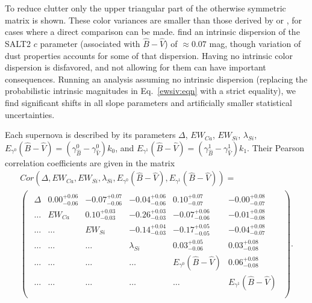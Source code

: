 \documentclass{aastex61}   	%
\begin{document}
To reduce clutter only the upper triangular part of the otherwise symmetric matrix is shown.
These color variances are smaller than those derived by \citet{2003A&A...404..901N} or \citet{2007ApJ...659..122J}, for cases where
a direct comparison can be made.
  find an intrinsic dispersion of the SALT2 $c$ parameter (associated with ${\hat{B}}-{\hat{V}}$) of $\approx 0.07$ mag,
though variation of dust properties accounts for some of that dispersion.
Having no intrinsic color dispersion is disfavored, and not allowing for them can have important consequences.  Running an analysis assuming no intrinsic dispersion (replacing the probabilistic intrinsic magnitudes in Eq.~\ref{ewsiv:eqn}
with a strict equality), we find significant shifts in all slope parameters  and 
artificially
smaller statistical uncertainties.

Each supernova is described by its parameters $\Delta$, $EW_{Ca}$, $EW_{Si}$, $\lambda_{Si}$,
$E_{\gamma^0}({\hat{B}}-{\hat{V}})=(\gamma^0_{\hat{B}}-\gamma^0_{\hat{V}})k_0$, and $E_{\gamma^1}({\hat{B}}-{\hat{V}})=(\gamma^1_{\hat{B}}-\gamma^1_{\hat{V}})k_1$.
Their Pearson correlation coefficients  are given in the matrix
\begin{multline}
Cor(\Delta, EW_{Ca}, EW_{Si}, \lambda_{Si}, E_{\gamma^0}({\hat{B}}-{\hat{V}}), E_{\gamma^1}({\hat{B}}-{\hat{V}})) =\\
\begin{pmatrix}
\begin{array}{rrrrrr}
\Delta & 0.00^{+0.06}_{-0.06} & -0.07^{+0.07}_{-0.06} & -0.04^{+0.06}_{-0.06} & 0.10^{+0.07}_{-0.07} & -0.00^{+0.08}_{-0.07} \\
\ldots  &EW_{Ca} & 0.10^{+0.03}_{-0.03} & -0.26^{+0.03}_{-0.03} & -0.07^{+0.06}_{-0.06} & -0.01^{+0.08}_{-0.08} \\
\ldots  & \ldots &  EW_{Si} & -0.14^{+0.04}_{-0.03} & -0.17^{+0.05}_{-0.05} & -0.04^{+0.08}_{-0.07} \\
\ldots & \ldots  &\ldots  & \lambda_{Si} & 0.03^{+0.05}_{-0.06} & 0.03^{+0.08}_{-0.08} \\
\ldots & \ldots & \ldots & \ldots & E_{\gamma^0}({\hat{B}}-{\hat{V}}) & 0.06^{+0.08}_{-0.08} \\
\ldots &\ldots  & \ldots  &\ldots & \ldots & E_{\gamma^1}({\hat{B}}-{\hat{V}}) \\
\end{array}
\end{pmatrix}.
\end{multline}
\end{document}
